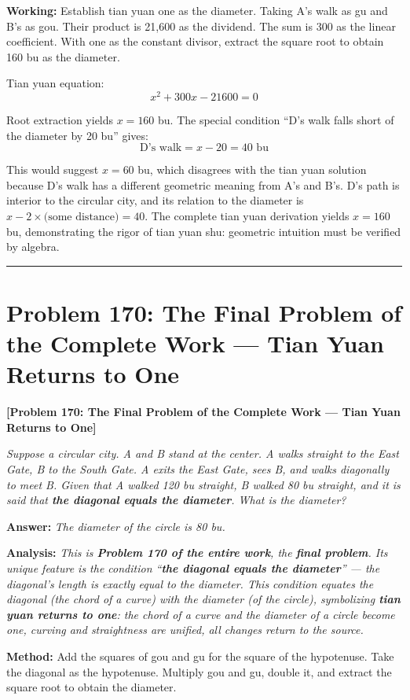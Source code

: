 \documentclass[11pt,a4paper]{book}
\newcommand{\answer}[1]{\noindent\textbf{\color{anacolor}Answer: }\textit{#1}\par}
\newcommand{\method}[1]{\noindent\textbf{\color{methodcolor}Method: }#1\par}
\newcommand{\working}[1]{\noindent\textbf{\color{workcolor}Working: }#1\par}
\newcommand{\analysis}[1]{\noindent\textbf{\color{anacolor}Analysis: }\textit{#1}\par}
\newcommand{\shortline}{\noindent\rule{0.5\textwidth}{0.4pt}\par}
\begin{document}
\working{Establish tian yuan one as the diameter. Taking A's walk as gu and B's as gou. Their product is 21,600 as the dividend. The sum is 300 as the linear coefficient. With one as the constant divisor, extract the square root to obtain 160 bu as the diameter.

Tian yuan equation:
$$x^2 + 300x - 21600 = 0$$

Root extraction yields $x = 160$ bu. The special condition ``D's walk falls short of the diameter by 20 bu'' gives:
$$\text{D's walk} = x - 20 = 40 \text{ bu}$$

This would suggest $x = 60$ bu, which disagrees with the tian yuan solution because D's walk has a different geometric meaning from A's and B's. D's path is interior to the circular city, and its relation to the diameter is $x - 2 \times \text{(some distance)} = 40$. The complete tian yuan derivation yields $x = 160$ bu, demonstrating the rigor of tian yuan shu: geometric intuition must be verified by algebra.}

\shortline

\section{Problem 170: The Final Problem of the Complete Work --- Tian Yuan Returns to One}
\label{sec:prob170}

\noindent\textbf{\color{probcolor}[Problem 170: The Final Problem of the Complete Work --- Tian Yuan Returns to One]}

\textit{Suppose a circular city. A and B stand at the center. A walks straight to the East Gate, B to the South Gate. A exits the East Gate, sees B, and walks diagonally to meet B. Given that A walked 120 bu straight, B walked 80 bu straight, and it is said that \textbf{the diagonal equals the diameter}. What is the diameter?}

\answer{The diameter of the circle is 80 bu.}

\analysis{This is \textbf{Problem 170 of the entire work}, the \textbf{final problem}. Its unique feature is the condition ``\textbf{the diagonal equals the diameter}'' --- the diagonal's length is exactly equal to the diameter. This condition equates the diagonal (the chord of a curve) with the diameter (of the circle), symbolizing \textbf{tian yuan returns to one}: the chord of a curve and the diameter of a circle become one, curving and straightness are unified, all changes return to the source.}

\method{Add the squares of gou and gu for the square of the hypotenuse. Take the diagonal as the hypotenuse. Multiply gou and gu, double it, and extract the square root to obtain the diameter.}
\end{document}
